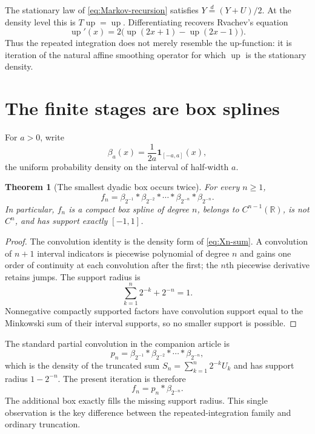 \documentclass[11pt,oneside]{article}
\newtheorem{theorem}{Theorem}[section]
\theoremstyle{definition}
\theoremstyle{remark}
\newcommand{\R}{\mathbb R}
\newcommand{\Up}{\operatorname{up}}
\begin{document}
The stationary law of \eqref{eq:Markov-recursion} satisfies
$Y\overset d=(Y+U)/2$.  At the density level this is $T\Up=\Up$.  Differentiating recovers
Rvachev's equation
\begin{equation}
 \Up'(x)=2\bigl(\Up(2x+1)-\Up(2x-1)\bigr).                \label{eq:up-diffeq}
\end{equation}
Thus the repeated integration does not merely resemble the up-function: it is iteration of
the natural affine smoothing operator for which $\Up$ is the stationary density.

\section{The finite stages are box splines}
\label{sec:box-splines}

For $a>0$, write
\begin{equation}
 \beta_a(x)=\frac1{2a}\mathbf 1_{[-a,a]}(x),               \label{eq:beta}
\end{equation}
the uniform probability density on the interval of half-width $a$.

\begin{theorem}[The smallest dyadic box occurs twice]
\label{thm:box-convolution}
For every $n\ge1$,
\begin{equation}
 \boxed{\displaystyle
 f_n=\beta_{2^{-1}}*\beta_{2^{-2}}*\cdots*\beta_{2^{-n}}*\beta_{2^{-n}}.}
                                                                    \label{eq:fn-box}
\end{equation}
In particular, $f_n$ is a compact box spline of degree $n$, belongs to $C^{n-1}(\R)$, is not
$C^n$, and has support exactly $[-1,1]$.
\end{theorem}

\begin{proof}
The convolution identity is the density form of \eqref{eq:Xn-sum}.  A convolution of $n+1$
interval indicators is piecewise polynomial of degree $n$ and gains one order of continuity
at each convolution after the first; the $n$th piecewise derivative retains jumps.  The
support radius is
\[
 \sum_{k=1}^{n}2^{-k}+2^{-n}=1.
\]
Nonnegative compactly supported factors have convolution support equal to the Minkowski sum
of their interval supports, so no smaller support is possible.
\end{proof}

The standard partial convolution in the companion article is
\begin{equation}
 p_n=\beta_{2^{-1}}*\beta_{2^{-2}}*\cdots*\beta_{2^{-n}},   \label{eq:pn}
\end{equation}
which is the density of the truncated sum
$S_n=\sum_{k=1}^{n}2^{-k}U_k$ and has support radius $1-2^{-n}$.  The present iteration is
therefore
\begin{equation}
 f_n=p_n*\beta_{2^{-n}}.                                   \label{eq:fn-pn}
\end{equation}
The additional box exactly fills the missing support radius.  This single observation is the
key difference between the repeated-integration family and ordinary truncation.
\end{document}
